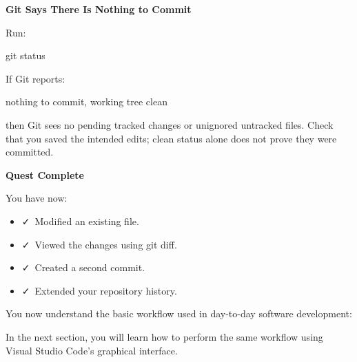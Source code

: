 \documentclass{csc2059practical}
\begin{document}
\begin{commonerror}
\textbf{Git Says There Is Nothing to Commit}\par
\medskip
Run:

\begin{terminalplain}
  git status
\end{terminalplain}
If Git reports:

\begin{terminalplain}
  nothing to commit, working tree clean
\end{terminalplain}
then Git sees no pending tracked changes or unignored untracked files. Check that you saved the intended edits; clean status alone does not prove they were committed.
\end{commonerror}

\begin{wrapupbox}
\textbf{Quest Complete}\par
\medskip
You have now:

\begin{itemize}
  \item \faCheck\ Modified an existing file.
  \item \faCheck\ Viewed the changes using git diff.
  \item \faCheck\ Created a second commit.
  \item \faCheck\ Extended your repository history.
\end{itemize}

You now understand the basic workflow used in day-to-day software development:

\begin{figure}[H]
\centering
{}
\end{figure}

In the next section, you will learn how to perform the same workflow using Visual Studio Code's graphical interface.
\end{wrapupbox}
\end{document}
